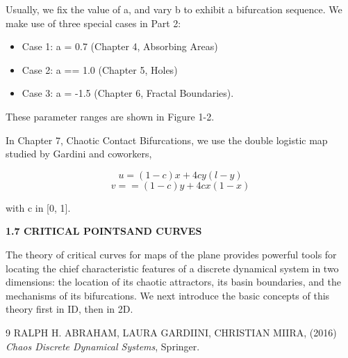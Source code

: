 \documentclass[12pt]{article}
\begin{document}
Usually, we fix the value of a, and vary b to exhibit a bifurcation
sequence. We make use of three special cases in Part 2:

\begin{itemize}
\item Case 1: a = 0.7 (Chapter 4, Absorbing Areas)
\item Case 2: a == 1.0 (Chapter 5, Holes)
\item Case 3: a = -1.5 (Chapter 6, Fractal Boundaries).
\end{itemize}

These parameter ranges are shown in Figure 1-2.

In Chapter 7, Chaotic Contact Bifurcations, we use the double
logistic map studied by Gardini and coworkers,

\[
u = (1- c)x + 4cy(l- y)
\]
\[
v == (1 - c)y + 4cx( 1 - x)
\]

with c in [0, 1].

\hfill

\textbf{1.7 CRITICAL POINTSAND CURVES}

\hfill

The theory of critical curves for maps of the plane provides
powerful tools for locating the chief characteristic features of a discrete
dynamical system in two dimensions: the location of its
chaotic attractors, its basin boundaries, and the mechanisms of its
bifurcations. We next introduce the basic concepts of this theory
first in ID, then in 2D.

\begin{thebibliography}{9}
RALPH H. ABRAHAM, LAURA GARDIINI, CHRISTIAN MIIRA, (2016) \emph{Chaos Discrete Dynamical Systems}, Springer.

\end{thebibliography}
\end{document}
